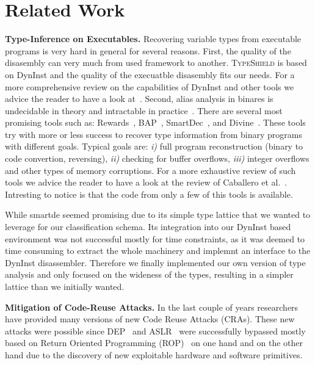 \newpage
\newpage
\section{Related Work}
\label{chapter:Related_Work}

\textbf{Type-Inference on Executables.}
\label{Type-Inference on Executables}
Recovering variable types from executable programs
is very hard in general for several reasons. 
First, the quality of the disasembly can very much from used
framework to another. \textsc{TypeShield} is based on DynInst 
and the quality of the execuatble disasembly fits our needs. 
For a more comprehensive review on the capabilities of DynInst and other tools we
advice the reader to have a look at~\cite{andriesse:indepth}.
Second, alias analysis in binares is undecidable in theory and intractable in practice~\cite{alan:mycroft}.
There are several most promising tools such as: Rewards~\cite{lin:rewards}, BAP~\cite{bap:brumley}, 
SmartDec~\cite{fokin:smartdec}, and Divine~\cite{divine:balakrishnan}.
These tools try with more or less success to recover 
type information from binary programs with different goals.
Typical goals are: 
\textit{i)} full program reconstruction (binary to code convertion, reversing), 
\textit{ii)} checking for buffer overflows, 
\textit{iii)} integer overflows and other types of memory corruptions.
For a more exhaustive review of such tools we advice the reader to
have a look at the review of Caballero et al.~\cite{caballero:inference}.
Intresting to notice is that the code from only a few of this tools is available.

While smartde seemed promising due to its simple type lattice that we wanted to leverage for our classification schema. Its integration into our DynInst based environment was not successful mostly for time constraints, as it was deemed to time consuming to extract the whole machinery and implemnt an interface to the DynInst disassembler.
Therefore we finally implemented our own version of type analysis and only focused on the wideness of the types, resulting in a simpler lattice than we initially wanted.

\textbf{Mitigation of Code-Reuse Attacks.}
\label{Mitigation of Code-Reuse Attacks}
In the last couple of years researchers have provided many versions of new Code Reuse Attacks (CRAs).
These new attacks were possible since DEP~\cite{dep} and ASLR~\cite{ASLR} were successfully bypassed mostly based
on Return Oriented Programming (ROP)~\cite{ROP, kornau:rop, rop:shacham} on one hand and on 
the other hand due to the discovery of new exploitable hardware and software primitives.

